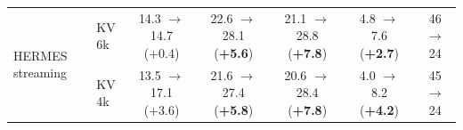 \begin{table}[t]
\begin{tabular}{llccccc}
\midrule
\multirow{2}{*}{HERMES streaming} & KV 6k & 14.3 $\rightarrow$ 14.7 (+0.4) & 22.6 $\rightarrow$ 28.1 (\textbf{+5.6}) & 21.1 $\rightarrow$ 28.8 (\textbf{+7.8}) & 4.8 $\rightarrow$ 7.6 (\textbf{+2.7}) & 46 $\rightarrow$ 24 \\
 & KV 4k & 13.5 $\rightarrow$ 17.1 (+3.6) & 21.6 $\rightarrow$ 27.4 (\textbf{+5.8}) & 20.6 $\rightarrow$ 28.4 (\textbf{+7.8}) & 4.0 $\rightarrow$ 8.2 (\textbf{+4.2}) & 45 $\rightarrow$ 24 \\
\bottomrule
\end{tabular}
\end{table}
